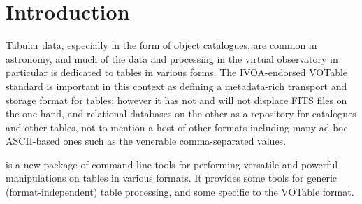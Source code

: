 \documentclass[11pt,twoside]{article}  %
\begin{document}
%
%

\section{Introduction}

Tabular data, especially in the form of object catalogues, 
are common in astronomy, and much of the data and processing 
in the virtual observatory in particular is dedicated to tables
in various forms.  The IVOA-endorsed VOTable standard is important
in this context as defining a metadata-rich transport and storage 
format for tables; however it has not and will not displace
FITS files on the one hand, and relational databases on the
other as a repository for catalogues and other tables,
not to mention a host of other formats including many ad-hoc
ASCII-based ones such as the venerable comma-separated values.

is a new package of command-line tools for performing versatile
and powerful manipulations on tables in various formats.
It provides some tools for generic (format-independent) table
processing, and some specific to the VOTable format.
\end{document}

